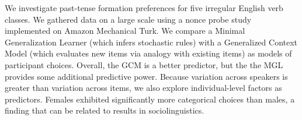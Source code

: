 We investigate past-tense formation preferences for five irregular English verb classes. We gathered data on a large scale using a nonce probe study implemented on Amazon Mechanical Turk. We compare a Minimal Generalization Learner (which infers stochastic rules) with a Generalized Context Model (which evaluates new items via analogy with existing items) as models of participant choices. Overall, the GCM is a better predictor, but the the MGL provides some additional predictive power. Because variation across speakers is greater than variation across items, we also explore individual-level factors as predictors. Females exhibited significantly more categorical choices than males, a finding that can be related to results in sociolinguistics.
